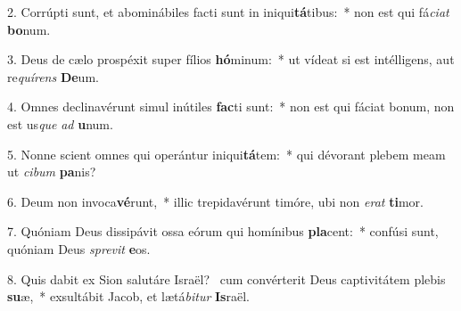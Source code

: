 2. Corrúpti sunt, et abominábiles facti sunt in iniqui\textbf{tá}tibus:~*  non est qui fá\textit{ci}\textit{at} \textbf{bo}num.\

3. Deus de cælo prospéxit super fílios \textbf{hó}minum:~*  ut vídeat si est intélligens, aut re\textit{quí}\textit{rens} \textbf{De}um.\

4. Omnes declinavérunt simul inútiles \textbf{fac}ti sunt:~*  non est qui fáciat bonum, non est us\textit{que} \textit{ad} \textbf{u}num.\

5. Nonne scient omnes qui operántur iniqui\textbf{tá}tem:~*  qui dévorant plebem meam ut \textit{ci}\textit{bum} \textbf{pa}nis?\

6. Deum non invoca\textbf{vé}runt,~*  illic trepidavérunt timóre, ubi non \textit{e}\textit{rat} \textbf{ti}mor.\

7. Quóniam Deus dissipávit ossa eórum qui homínibus \textbf{pla}cent:~*  confúsi sunt, quóniam Deus \textit{spre}\textit{vit} \textbf{e}os.\

8. Quis dabit ex Sion salutáre Israël? \dag\  cum convérterit Deus captivitátem plebis \textbf{su}æ,~*  exsultábit Jacob, et lætá\textit{bi}\textit{tur} \textbf{Is}raël.\

